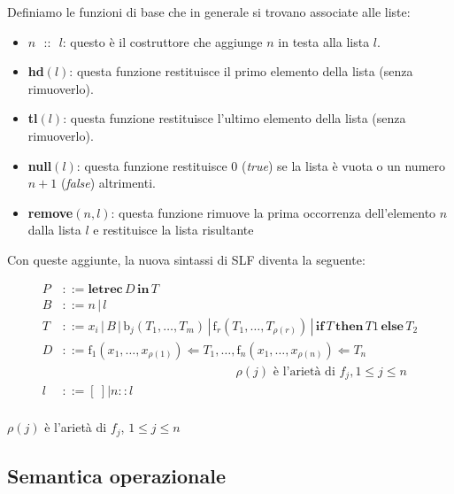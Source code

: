 		Definiamo le funzioni di base che in generale si trovano associate alle
		liste:
		\begin{itemize}
		  \item $n\text{ }\textbf{::}\text{ }l$: questo \`e il costruttore che aggiunge
		  $n$ in testa alla lista $l$.
		  \item \textbf{hd}$(l)$: questa funzione restituisce il primo elemento della
		  lista (senza rimuoverlo).
		  \item \textbf{tl}$(l)$: questa funzione restituisce l'ultimo elemento della
		  lista (senza rimuoverlo).
		  \item \textbf{null}$(l)$: questa funzione restituisce $0$ (\emph{true})
		  se la lista \`e vuota o un numero $n+1$ (\emph{false}) altrimenti.
		  \item \textbf{remove}$(n,l)$: questa funzione rimuove la prima occorrenza dell'elemento $n$ dalla lista $l$ e restituisce la lista risultante
		\end{itemize}

		Con queste aggiunte, la nuova sintassi di SLF diventa la seguente:
		
		\begin{align*}
			P & ::= \textbf{letrec} \, D \, \textbf{in} \, T\\
			B & ::= n \, | \, l\\
			T & ::= x_i \, | \, B \, | \, \text{b}_j(T_1,\dots,T_m) \, | \, \text{f}_r(T_1,\dots,T_{\rho(r)}) \, | \, \textbf{if} \, T \, \textbf{then} \, T1 \, \textbf{else} \, T_2\\
			D & ::= \text{f}_1(x_1,\dots,x_{\rho(1)})\Leftarrow T_1,\dots,\text{f}_n(x_1,\dots,x_{\rho(n)}) \Leftarrow T_n\\ 
			& \qquad\qquad\qquad\qquad\qquad\qquad\qquad \rho(j) \text{ \`{e} l'ariet\`{a} di }f_j,1\leq j\leq n\\
			l & ::= [\ ] | n::l\\
		\end{align*}
		\vspace{-16 mm}
		\begin{flushright}
			$\rho(j)$ \`{e} l'ariet\`{a} di $f_j$, $1\leq j\leq n$
		\end{flushright}
		
		\subsection{Semantica operazionale}
		
